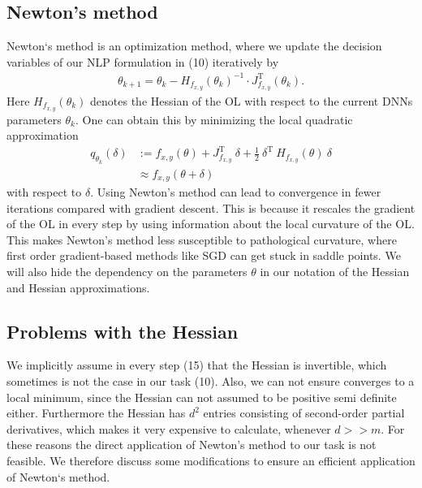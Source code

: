 \documentclass[conference]{IEEEtran}
\begin{document}
	\subsection{Newton's method}\label{AA}
	Newton`s method is an optimization method, where we update the decision variables of our NLP formulation in (10) iteratively by
	\begin{align}
	\theta_{k+1} = \theta_{k} -H_{f_{x, y}}(\theta_{k})^{-1}\cdot J_{f_{x, y}}^{\mathrm{T}}(\theta_{k}).
	\end{align}
	Here $H_{f_{x, y}}(\theta_{k})$ denotes the Hessian of the OL with respect to the current DNNs parameters $\theta_{k}$. One can obtain this by minimizing the local quadratic approximation
	\begin{align}
	q_{\theta_{k}}(\delta)&:= f_{x, y}(\theta) + J_{f_{x, y}}^{\mathrm{T}}\:\delta + \frac{1}{2}\:\delta^{\mathrm{T}}\:H_{f_{x, y}}(\theta)\:\delta\\
	&\approx f_{x, y}(\theta + \delta)
	\end{align}
	with respect to $\delta$. 
	Using Newton's method can lead to convergence in fewer iterations compared with gradient descent. This is because it rescales the gradient of the OL in every step by using information about the local curvature of the OL. This makes Newton's method less susceptible to pathological curvature, where first order gradient-based methods like SGD can get stuck in saddle points. We will also hide the dependency on the parameters $\theta$ in our notation of the Hessian and Hessian approximations.
	
	\subsection{Problems with the Hessian}
	We implicitly assume in every step (15) that the Hessian is invertible, which sometimes is not the case in our task (10). Also, we can not ensure converges to a local minimum, since the Hessian can not assumed to be positive semi definite either. Furthermore the Hessian has $d^{2}$ entries consisting of second-order partial derivatives, which makes it very expensive to calculate, whenever $d>>m$. For these reasons the direct application of Newton's method to our task is not feasible. We therefore discuss some modifications to ensure an efficient application of Newton`s method.
	
\end{document}
